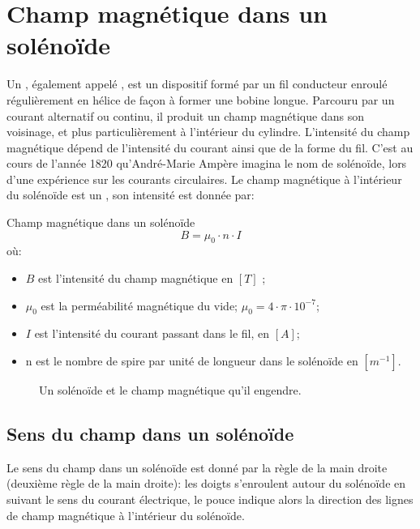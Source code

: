 \section{Champ magnétique dans un solénoïde}
Un , également appelé , est un dispositif formé par un fil conducteur enroulé  régulièrement en hélice de façon à former une bobine longue. Parcouru par un courant alternatif ou continu, il produit un champ magnétique dans son voisinage, et plus particulièrement à l'intérieur du cylindre. L'intensité du champ magnétique dépend de l'intensité du courant ainsi que de la forme du fil. C'est au cours de l'année 1820 qu'André-Marie Ampère imagina le nom de solénoïde, lors d'une expérience sur les courants circulaires.
Le champ magnétique à l'intérieur du solénoïde est un , son intensité est donnée par:
\begin{encadre_equation*}{Champ magnétique dans un solénoïde}
    \begin{equation}
        B =\mu_0 \cdot n \cdot I
    \end{equation}
    où:
    \begin{itemize}[label=\textbullet]
        \item \(B\) est l'intensité du champ magnétique en \([T]\) ;
        \item \(\mu_0\) est la perméabilité magnétique du vide; \(\mu_0=4 \cdot \pi \cdot 10^{-7}\);
        \item \(I\) est l'intensité du courant passant dans le fil, en \([A]\);
        \item n est le nombre de spire par unité de longueur dans le solénoïde en \([m^{-1}]\).
    \end{itemize}
\end{encadre_equation*}

\newpage

\begin{figure}[ht]
    \centering
    \resizebox{\linewidth}{!}{
        }
    \caption{Un solénoïde et le champ magnétique qu'il engendre.}
    \label{solenoide}
\end{figure}

\newpage

\subsection{Sens du champ dans un solénoïde}
Le sens du champ dans un solénoïde est donné par la règle de la main droite (deuxième règle de la main droite): les doigts s'enroulent autour du solénoïde en suivant le sens du courant électrique, le pouce indique alors la direction des lignes de champ magnétique à l'intérieur du solénoïde.

